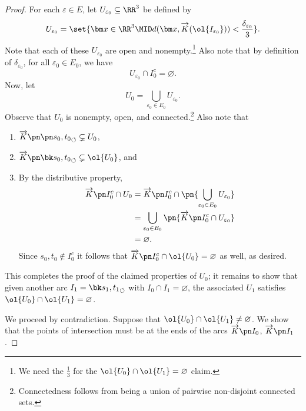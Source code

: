\begin{proof}
  For each $\varepsilon \in E$, let $U_{\varepsilon_0} \subseteq
  \RR^3$ be defined by
  \[
    U_{\varepsilon_0} = \set{\bm x \in \RR^3 \MID d(\bm x,
      \overrightarrow{K}(\ol{I_{\varepsilon_0}})) <
      \frac{\delta_{\varepsilon_0}}{3}}.
  \]
  Note that each of these $U_{\varepsilon_0}$ are open and
  nonempty.\footnote{We need the $\frac{1}{3}$ for the $\ol{U_0}\cap
    \ol{U_1} = \varnothing$ claim.} Also note that by definition of
  $\delta_{\varepsilon_0}$, for all $\varepsilon_0 \in E_0$, we have
  \[
    U_{\varepsilon_0} \cap I_0^c = \varnothing.
  \]
  Now, let
  \[
    U_0 = \bigcup_{\varepsilon_0 \in E_0} U_{\varepsilon_0}.
  \]
  Observe that $U_0$ is nonempty, open, and
  connected.\footnote{Connectedness follows from being a union of
    pairwise non-disjoint connected sets.} Also note that
  \begin{enumerate}
    \item $\fim{K}{\spn{s_0, t_0}} \subsetneq U_0$,
    \item $\fim{K}{\sbk{s_0, t_0}} \subsetneq \ol{U_0}$, and
    \item By the distributive property,
      \begin{align*}
        \fim{K}{I_0^c} \cap U_0
        &= \fim{K}{I_0^c} \cap \pn{\bigcup_{\varepsilon_0 \in E_0}
          U_{\varepsilon_0}} \\
        &= \bigcup_{\varepsilon_0 \in E_0} \pn{\fim{K}{I_0^c} \cap
          U_{\varepsilon_0}} \\
        &= \varnothing.
      \end{align*}
      Since $s_0, t_0 \not \in I_0^c$ it follows that $\fim{K}{I_0^c}
      \cap \ol{U_0}= \varnothing$ as well, as desired.
  \end{enumerate}
  This completes the proof of the claimed properties of $U_0$; it
  remains to show that given another arc $I_1 = \sbk{s_1, t_1}$ with
  $I_0 \cap I_1 = \varnothing$, the associated $U_1$ satisfies
  $\ol{U_0} \cap \ol{U_1} = \varnothing$.

  We proceed by contradiction. Suppose that $\ol{U_0} \cap \ol{U_1}
  \neq \varnothing$. We show that the points of intersection must be
  at the ends of the arcs $\fim{K}{I_0}$, $\fim{K}{I_1}$.


\end{proof}
